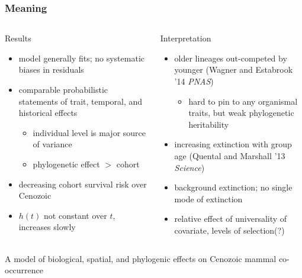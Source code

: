 \documentclass{beamer}
\begin{document}
\begin{frame}
  \frametitle{Meaning}
  \begin{columns}
    \begin{column}{0.5\textwidth}
      Results
      \begin{itemize}
        \item model generally fits; no systematic biases in residuals
        \item comparable probabilistic statements of trait, temporal, and historical effects
          \begin{itemize}
            \item individual level is major source of variance
            \item phylogenetic effect \(>\) cohort
          \end{itemize}
        \item decreasing cohort survival risk over Cenozoic
        \item \(h(t)\) not constant over \(t\), increases slowly
      \end{itemize}
    \end{column}
    \begin{column}{0.5\textwidth}
      Interpretation
      \begin{itemize}
        \item older lineages out-competed by younger (Wagner and Estabrook '14 \textit{PNAS})
          \begin{itemize}
            \item hard to pin to any organismal traits, but weak phylogenetic heritability
          \end{itemize}
        \item increasing extinction with group age (Quental and Marshall '13 \textit{Science})
        \item background extinction; no single mode of extinction
        \item relative effect of universality of covariate, levels of selection(?)
      \end{itemize}
    \end{column}
  \end{columns}
\end{frame}


\begin{frame}
  A model of biological, spatial, and phylogenic effects on Cenozoic mammal co-occurrence
\end{frame}
\end{document}
